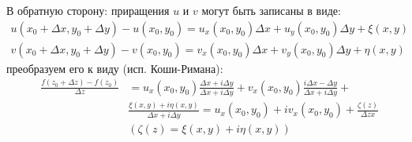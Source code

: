 \documentclass[12pt]{extarticle}
\begin{document}
\par В обратную сторону: приращения $u$ и $v$ могут быть записаны в
виде:
\begin{eqnarray*}
    u(x_{0}+\Delta x,y_{0}+\Delta y)-u(x_{0},y_{0})
    =u_{x}(x_{0},y_{0})\Delta x+u_{y}(x_{0},y_{0})\Delta y+\xi(x,y)\\
    v(x_{0}+\Delta x,y_{0}+\Delta y)-v(x_{0},y_{0})
    =v_{x}(x_{0},y_{0})\Delta x+v_{y}(x_{0},y_{0})\Delta y+\eta(x,y)
\end{eqnarray*}
преобразуем его к виду (исп. Коши-Римана):
\begin{eqnarray*}
& \frac{f(z_{0}+\Delta z)-f(z_{0})}{\Delta z} &
=u_{x}(x_{0},y_{0})\frac{\Delta x+i\Delta y}{\Delta x+i\Delta y}
+v_{x}(x_{0},y_{0})\frac{i\Delta x -\Delta y}{\Delta x+i\Delta y}+\\
&&\frac{\xi(x,y)+i\eta(x,y)}{\Delta x+i\Delta y}
=u_{x}(x_{0},y_{0})+iv_{x}(x_{0},y_{0})+\frac{\zeta(z)}{\Delta zx}\\
&&(\zeta(z)=\xi(x,y)+i\eta(x,y))
\end{eqnarray*}
\end{document}
